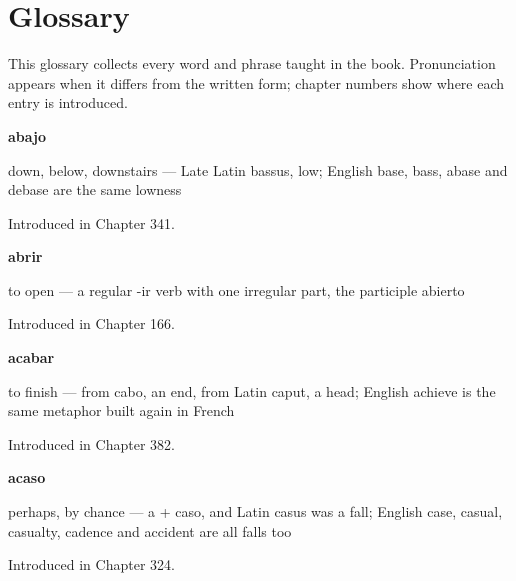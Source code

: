 
\chapter*{Glossary}

This glossary collects every word and phrase taught in the book. Pronunciation appears when it differs from the written form; chapter numbers show where each entry is introduced.

\noindent\begin{minipage}[t]{\linewidth}
\raggedright
\textbf{abajo}\par
\small down, below, downstairs — Late Latin bassus, low; English base, bass, abase and debase are the same lowness\par
\footnotesize Introduced in Chapter 341.
\end{minipage}\par\medskip

\noindent\begin{minipage}[t]{\linewidth}
\raggedright
\textbf{abrir}\par
\small to open — a regular -ir verb with one irregular part, the participle abierto\par
\footnotesize Introduced in Chapter 166.
\end{minipage}\par\medskip

\noindent\begin{minipage}[t]{\linewidth}
\raggedright
\textbf{acabar}\par
\small to finish — from cabo, an end, from Latin caput, a head; English achieve is the same metaphor built again in French\par
\footnotesize Introduced in Chapter 382.
\end{minipage}\par\medskip

\noindent\begin{minipage}[t]{\linewidth}
\raggedright
\textbf{acaso}\par
\small perhaps, by chance — a + caso, and Latin casus was a fall; English case, casual, casualty, cadence and accident are all falls too\par
\footnotesize Introduced in Chapter 324.
\end{minipage}\par\medskip

